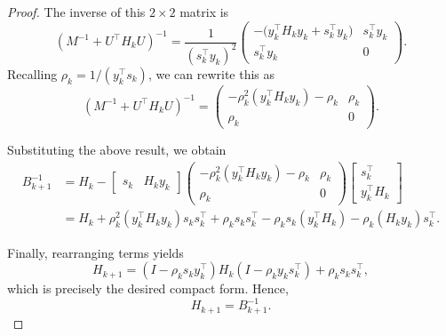 \documentclass[a4paper, 10pt, dvipdfmx,draft]{article}
\begin{document}
\begin{proof}
    The inverse of this $2 \times 2$ matrix is
    \begin{equation*}
        (M^{-1} + U^\top H_k U)^{-1}
        =
        \frac{1}{(s_k^\top y_k)^2}
        \begin{pmatrix}
            -\bigl(y_k^\top H_k y_k + s_k^\top y_k\bigr) & s_k^\top y_k \\
            s_k^\top y_k                                 & 0
        \end{pmatrix}.
    \end{equation*}
    Recalling $\rho_k = 1 / (y_k^\top s_k)$, we can rewrite this as
    \begin{equation*}
        (M^{-1} + U^\top H_k U)^{-1}
        =
        \begin{pmatrix}
            -\rho_k^2 (y_k^\top H_k y_k) - \rho_k & \rho_k \\
            \rho_k                                & 0
        \end{pmatrix}.
    \end{equation*}

    Substituting the above result, we obtain
    \begin{align*}
        B_{k+1}^{-1}
         & = H_k
        - \begin{bmatrix} s_k & H_k y_k \end{bmatrix}
        \begin{pmatrix}
            -\rho_k^2 (y_k^\top H_k y_k) - \rho_k & \rho_k \\
            \rho_k                                & 0
        \end{pmatrix}
        \begin{bmatrix} s_k^\top \\ y_k^\top H_k \end{bmatrix} \\
         & = H_k
        + \rho_k^2 (y_k^\top H_k y_k) s_k s_k^\top
        + \rho_k s_k s_k^\top
        - \rho_k s_k (y_k^\top H_k)
        - \rho_k (H_k y_k) s_k^\top.
    \end{align*}

    Finally, rearranging terms yields
    \begin{equation*}
        H_{k+1}
        = (I - \rho_k s_k y_k^\top) H_k (I - \rho_k y_k s_k^\top)
        + \rho_k s_k s_k^\top,
    \end{equation*}
    which is precisely the desired compact form. Hence,
    \begin{equation*}
        H_{k+1} = B_{k+1}^{-1}.
    \end{equation*}
\end{proof}
\end{document}
